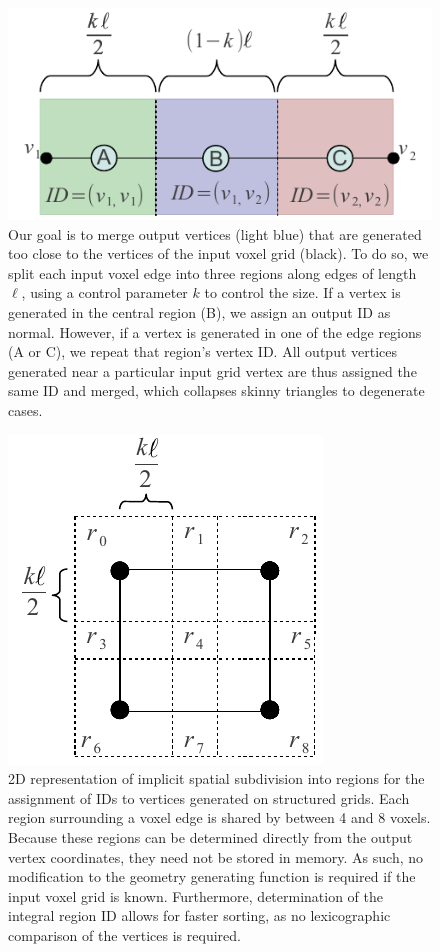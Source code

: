 \documentclass[review,journal]{vgtc}         %
\begin{document}
\begin{figure}[!b]
\begin{center}
\includegraphics[height=0.5\columnwidth]{IDs.pdf}
\caption{Our goal is to merge output vertices (light blue) that are generated too close to the vertices of the input voxel grid (black). To do so, we split each input voxel edge into three regions along edges of length $\ell$, using a control parameter $k$ to control the size. If a vertex is generated in the central region (B), we assign an output ID as normal. However, if a vertex is generated in one of the edge regions (A or C), we repeat that region's vertex ID. All output vertices generated near a particular input grid vertex are thus assigned the same ID and merged, which collapses skinny triangles to degenerate cases.}
\label{fig:IDs}
\end{center}
\end{figure}

\begin{figure}[!tb]
\begin{center}
\includegraphics[height=0.5\columnwidth]{Subdivision.pdf}
\caption{2D representation of implicit spatial subdivision into regions for the assignment of IDs to vertices generated on structured grids. Each region surrounding a voxel edge is shared by between 4 and 8 voxels. Because these regions can be determined directly from the output vertex coordinates, they need not be stored in memory. As such, no modification to the geometry generating function is required if the input voxel grid is known. Furthermore, determination of the integral region ID allows for faster sorting, as no lexicographic comparison of the vertices is required.}
\label{fig:Subdivision}
\end{center}
\end{figure}
\end{document}
